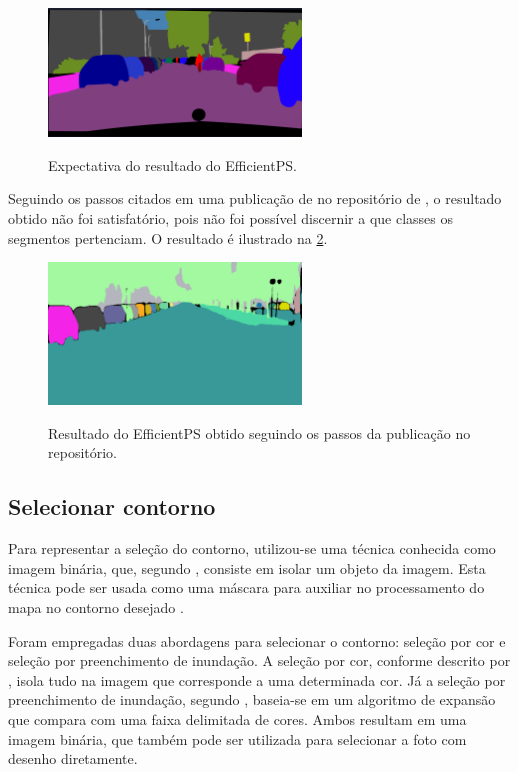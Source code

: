 \begin{figure}[!ht]
\centering
\caption{Expectativa do resultado do EfficientPS.}
\includegraphics[width=0.6\textwidth]{figures/expectativa.png}
\label{fig:expectativa}
\end{figure}

Seguindo os passos citados em uma publicação de  no repositório de , o resultado obtido não foi satisfatório, pois não foi possível discernir a que classes os segmentos pertenciam. O resultado é ilustrado na \cref{fig:resultado_obtido}.

\begin{figure}[!ht]
\centering
\caption{Resultado do EfficientPS obtido seguindo os passos da publicação no repositório.}
\includegraphics[width=0.6\textwidth]{figures/resultado_obtido.png}
\label{fig:resultado_obtido}
\end{figure}

\subsection{Selecionar contorno}

Para representar a seleção do contorno, utilizou-se uma técnica conhecida como imagem binária, que, segundo , consiste em isolar um objeto da imagem. Esta técnica pode ser usada como uma máscara para auxiliar no processamento do mapa no contorno desejado \cite{Aznag2020}.

Foram empregadas duas abordagens para selecionar o contorno: seleção por cor e seleção por preenchimento de inundação. A seleção por cor, conforme descrito por , isola tudo na imagem que corresponde a uma determinada cor. Já a seleção por preenchimento de inundação, segundo , baseia-se em um algoritmo de expansão que compara com uma faixa delimitada de cores. Ambos resultam em uma imagem binária, que também pode ser utilizada para selecionar a foto com desenho diretamente.

